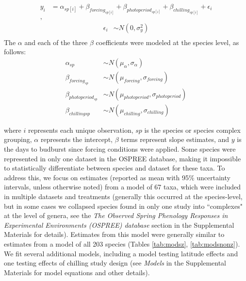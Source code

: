 \documentclass{article}
\begin{document}
\begin{align*}
y_i &= \alpha_{sp[i]} + \beta_{forcing_{sp[i]}} + \beta_{photoperiod_{sp[i]}} + \beta_{chilling_{sp[i]}} + \epsilon_i\\,
\end{align*}
\begin{align*}
\epsilon_i & \sim N(0,\sigma^2_y) \\
\end{align*}
\noindent The $\alpha$ and each of the three $\beta$ coefficients were modeled at the species level, as follows:
\begin{align*}
\alpha_{sp} & \sim N(\mu_{\alpha}, \sigma_{\alpha}) \\
\beta_{forcing_{sp}} & \sim N(\mu_{forcing}, \sigma_{forcing}) \\
\beta_{photoperiod_{sp}} & \sim N(\mu_{photoperiod}, \sigma_{photoperiod})\\
\beta_{chilling{sp}} & \sim N(\mu_{chilling}, \sigma_{chilling})
\end{align*}

where $i$ represents each unique observation, $sp$ is the species or species complex grouping, $\alpha$ represents the intercept, $\beta$ terms represent slope estimates, and $y$ is the days to budburst since forcing conditions were applied. Some species were represented in only one dataset in the OSPREE database, making it impossible to statistically differentiate between species and dataset for these taxa. To address this, we focus on estimates (reported as mean with 95\% uncertainty intervals, unless otherwise noted) from a model of  67 taxa, which were included in multiple datasets and treatments (generally this occurred at the species-level, but in some cases we collapsed species found in only one study into ``complexes" at the level of genera, see the \emph{The Observed Spring Phenology Responses in Experimental Environments (OSPREE) database} section in the Supplemental Materials for details). Estimates from this model were generally similar to estimates from a model of all 203 species (Tables \ref{tab:modsz}, \ref{tab:modsnonz}).  We fit several additional models, including a model testing latitude effects and one testing effects of chilling study design (see \emph{Models} in the Supplemental Materials for model equations and other details). %
\end{document}

